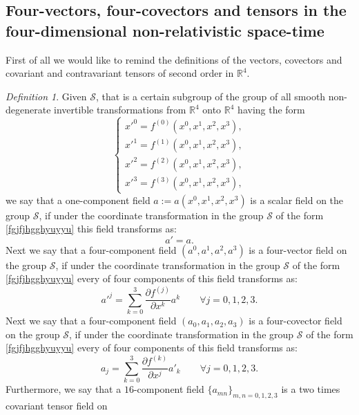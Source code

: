 \documentclass{article}
\theoremstyle{definition}
\newtheorem{definition}{Definition}[section]
\theoremstyle{remark}
\newcommand{\er}{\eqref}
\newcommand{\er}{\eqref}
\newtheorem{definition}{Definition}
\begin{document}
\subsection{Four-vectors, four-covectors and tensors in the
four-dimensional non-relativistic space-time} First of all we would
like to remind the definitions of the vectors, covectors and
covariant and contravariant tensors of second order in
$\mathbb{R}^4$.
\begin{definition}
Given $\mathcal{S}$, that is a certain subgroup of the group of all
smooth non-degenerate invertible transformations from $\mathbb{R}^4$
onto $\mathbb{R}^4$ having the form
\begin{equation}\label{fgjfjhgghyuyyu}
\begin{cases}
x'^0=f^{(0)}(x^0,x^1,x^2,x^3),\\
x'^1=f^{(1)}(x^0,x^1,x^2,x^3),\\
x'^2=f^{(2)}(x^0,x^1,x^2,x^3),\\
x'^3=f^{(3)}(x^0,x^1,x^2,x^3),
\end{cases}
\end{equation}
we say that a one-component field $a:=a(x^0,x^1,x^2,x^3)$ is a
scalar field on the group $\mathcal{S}$, if under the coordinate
transformation in the group $\mathcal{S}$ of the form
\er{fgjfjhgghyuyyu} this field transforms as:
\begin{equation}\label{fgjfjhgghhgjgihhi}
a'=a.
\end{equation}
Next we say that a four-component field $(a^0,a^1,a^2,a^3)$ is a
four-vector field on the group $\mathcal{S}$, if under the
coordinate transformation in the group $\mathcal{S}$ of the form
\er{fgjfjhgghyuyyu} every of four components of this field
transforms as:
\begin{equation}\label{fgjfjhgghhgjg}
a'^j=\sum_{k=0}^{3}\frac{\partial f^{(j)}}{\partial
x^k}a^k\quad\quad\forall j=0,1,2,3.
\end{equation}
Next we say that a four-component field $(a_0,a_1,a_2,a_3)$ is a
four-covector field on the group $\mathcal{S}$, if under the
coordinate transformation in the group $\mathcal{S}$ of the form
\er{fgjfjhgghyuyyu} every of four components of this field
transforms as:
\begin{equation}\label{fgjfjhgghhgjghjhj}
a_j=\sum_{k=0}^{3}\frac{\partial f^{(k)}}{\partial
x^j}a'_k\quad\quad\forall j=0,1,2,3.
\end{equation}
Furthermore, we say that a $16$-component field
$\{a_{mn}\}_{m,n=0,1,2,3}$ is a two times covariant tensor field on

\end{definition}
\end{document}
